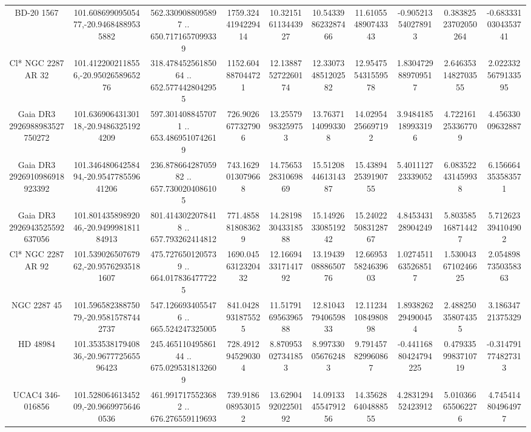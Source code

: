 \begin{table}
\begin{tabular}{cccccccccc}
BD-20  1567 & 101.60869909505477,-20.94684889535882 & 562.3309088095897 .. 650.7171657099339 & 1759.3244194229414 & 10.321516113443927 & 10.543398623287466 & 11.610554890743343 & -0.905213540278913 & 0.38382523702050264 & -0.6833310304353741 \\
Cl* NGC 2287     AR      32 & 101.4122002118556,-20.9502658965276 & 318.47845256185064 .. 652.5774428042955 & 1152.604887044721 & 12.138875272260174 & 12.330734851202582 & 12.954755431559578 & 1.8304729889709517 & 2.6463531482703555 & 2.0223325679133595 \\
Gaia DR3 2926988983527750272 & 101.63690643130118,-20.94863251924209 & 597.3014088457071 .. 653.4869510742619 & 726.9026677327906 & 13.25579983259753 & 13.76371140993308 & 14.02954256697192 & 3.9484185189933196 & 4.722161253367709 & 4.45633009632887 \\
Gaia DR3 2926910986918923392 & 101.34648064258494,-20.954778559641206 & 236.87866428705982 .. 657.7300204086105 & 743.1629013079668 & 14.756532831069869 & 15.512084461314387 & 15.438942539190755 & 5.401112723339052 & 6.083522431459938 & 6.156664353583571 \\
Gaia DR3 2926943525592637056 & 101.80143589892046,-20.949998181184913 & 801.4143022078418 .. 657.793262414812 & 771.4858818083629 & 14.281983043318588 & 15.149263308519242 & 15.240225083128767 & 4.845343128904249 & 5.803585168714427 & 5.712623394104902 \\
Cl* NGC 2287     AR      92 & 101.53902650767962,-20.95762935181607 & 475.7276501205739 .. 664.0178364777225 & 1690.0456312320432 & 12.166943317141792 & 13.194390888650776 & 12.669535824639603 & 1.0274511635268517 & 1.5300436710246625 & 2.0548987350358363 \\
NGC  2287    45 & 101.59658238875079,-20.95815787442737 & 547.1266934055476 .. 665.524247325005 & 841.0428931875525 & 11.517916956396588 & 12.810437940659833 & 12.112341084980898 & 1.8938262294900454 & 2.488250358074355 & 3.18634721375329 \\
HD  48984 & 101.35353817940836,-20.967772565596423 & 245.46511049586144 .. 675.0295318132609 & 728.4912945290304 & 8.870953027341853 & 8.997330056762483 & 9.791457829960867 & -0.44116880424794225 & 0.4793359983710719 & -0.314791774827313 \\
UCAC4 346-016856 & 101.52806461345209,-20.96699756460536 & 461.9917175523682 .. 676.276559119693 & 739.9186089530152 & 13.629049202250192 & 14.091334554791256 & 14.356286404888555 & 4.283129452423912 & 5.010366655062276 & 4.745414804964977 \\

\end{tabular}
\end{table}
